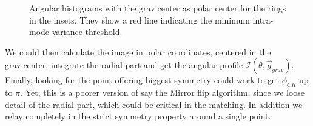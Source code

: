 \documentclass[11pt, a4paper, twoside]{article} %
\begin{document}
\begin{figure}[h!] 
     \centering 
    \caption{ Angular histograms with the gravicenter as polar center for the rings in the insets. They show a red line indicating the minimum intra-mode variance threshold.}
    \label{fig:histo}
\end{figure}

We could then calculate the image in polar coordinates, centered in the gravicenter, integrate the radial part and get the angular profile $\mathcal{I}(\theta,\vec{g}_{grav})$. Finally, looking for the point offering biggest symmetry could work to get $\phi_{CR}$ up to $\pi$. Yet, this is a poorer version of say the Mirror flip algorithm, since we loose detail of the radial part, which could be critical in the matching. In addition we relay completely in the strict symmetry property around a single point.
\end{document}
